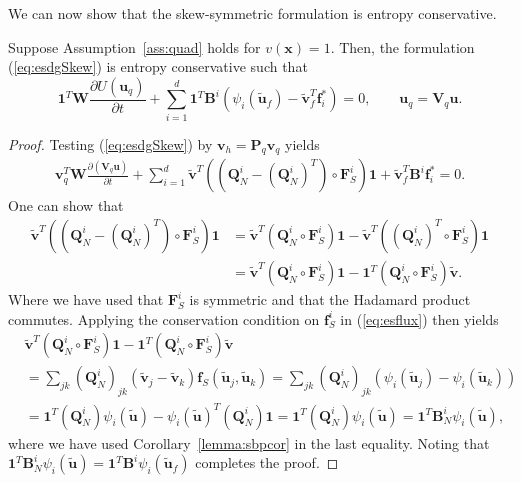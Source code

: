\documentclass{svjour3}                     %
\newcommand{\pd}[2]{\frac{\partial#1}{\partial#2}}
\newcommand{\LRp}[1]{\left( #1 \right)}
\begin{document}
We can now show that the skew-symmetric formulation is entropy conservative.  
\begin{theorem}
Suppose Assumption~\ref{ass:quad} holds for $v(\bm{x}) = 1$.  
Then, the formulation (\ref{eq:esdgSkew}) is entropy conservative such that
\begin{equation}
\bm{1}^T\bm{W}\pd{U(\bm{u}_q)}{t} + \sum_{i=1}^d\bm{1}^T\bm{B}^i \LRp{\psi_i(\tilde{\bm{u}}_f) - \tilde{\bm{v}}_f^T\bm{f}_i^*} = 0, \qquad \bm{u}_q = \bm{V}_q\bm{u}.
\label{eq:esdgthm}
\end{equation}
\label{thm:esdg}
\end{theorem}
\begin{proof}
Testing (\ref{eq:esdgSkew}) by $\bm{v}_h = \bm{P}_q\bm{v}_q$ yields 
\begin{align}
\bm{v}_q^T\bm{W}\pd{\LRp{\bm{V}_q\bm{u}}}{t} + \sum_{i=1}^d
\tilde{\bm{v}}^T \LRp{\LRp{\bm{Q}^i_N - \LRp{\bm{Q}^i_N}^T} \circ \bm{F}^i_S}\bm{1} + \tilde{\bm{v}}_f^T \bm{B}^i\bm{f}_i^* = 0.
\end{align}
One can show that \cite{chan2017discretely}
\begin{align*}
\tilde{\bm{v}}^T \LRp{\LRp{\bm{Q}^i_N - \LRp{\bm{Q}^i_N}^T} \circ \bm{F}^i_S}\bm{1} &= \tilde{\bm{v}}^T \LRp{\bm{Q}^i_N \circ \bm{F}^i_S}\bm{1} - \tilde{\bm{v}}^T \LRp{\LRp{\bm{Q}^i_N}^T \circ \bm{F}^i_S}\bm{1}\\
&= \tilde{\bm{v}}^T \LRp{\bm{Q}^i_N \circ \bm{F}^i_S}\bm{1} - \bm{1}^T \LRp{{\bm{Q}^i_N} \circ \bm{F}^i_S}\tilde{\bm{v}}.
\end{align*}
Where we have used that $\bm{F}^i_S$ is symmetric and that the Hadamard product commutes.  Applying the conservation condition on $\bm{f}^i_S$ in (\ref{eq:esflux}) then yields
\begin{align*}
&\tilde{\bm{v}}^T \LRp{\bm{Q}^i_N \circ \bm{F}^i_S}\bm{1} - \bm{1}^T \LRp{{\bm{Q}^i_N} \circ \bm{F}^i_S}\tilde{\bm{v}} \\
&= \sum_{jk} \LRp{\bm{Q}^i_N}_{jk} \LRp{\tilde{\bm{v}}_j-\tilde{\bm{v}}_k} \bm{f}_S\LRp{\tilde{\bm{u}}_j,\tilde{\bm{u}}_k} = \sum_{jk} \LRp{\bm{Q}^i_N}_{jk} \LRp{\psi_i(\tilde{\bm{u}}_j) - \psi_i(\tilde{\bm{u}}_k)}\\
&= \bm{1}^T\LRp{\bm{Q}^i_N}\psi_i(\tilde{\bm{u}}) - \psi_i(\tilde{\bm{u}})^T\LRp{\bm{Q}^i_N}\bm{1} = \bm{1}^T\LRp{\bm{Q}^i_N}\psi_i(\tilde{\bm{u}}) = \bm{1}^T\bm{B}^i_N\psi_i(\tilde{\bm{u}}),
\end{align*}
where we have used Corollary~\ref{lemma:sbpcor} in the last equality.  Noting that $\bm{1}^T\bm{B}^i_N\psi_i(\tilde{\bm{u}}) = \bm{1}^T\bm{B}^i \psi_i(\tilde{\bm{u}}_f)$ completes the proof.
\end{proof}
\end{document}
